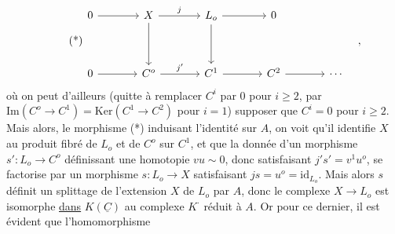 \begin{equation}\tag{*}
\begin{tikzcd}[column sep=large, row sep=huge]
0 \arrow[r] & X \arrow[r, "j"] \arrow[d] & L_o \arrow[r] \arrow[d] & 0 \\
0 \arrow[r] & C^o \arrow[r, "j'"] & C^1 \arrow[r] & C^2 \arrow[r] & \cdots
\end{tikzcd}\quad ,
\end{equation}
où on peut d'ailleurs (quitte à remplacer $C^i$ par $0$ pour $i \geq 2$, par $\mathrm{Im}(C^o \longrightarrow C^1) = \mathrm{Ker}(C^1 \longrightarrow C^2)$ pour $i = 1$) supposer que $C^i = 0$ pour $i \geq 2$. Mais alors, le morphisme (*) induisant l'identité sur $A$, on voit qu'il identifie $X$ au produit fibré de $L_o$ et de $C^o$ sur $C^1$, et que la donnée d'un morphisme $s' : L_o \longrightarrow C^o$ définissant une homotopie $vu \sim 0$, donc satisfaisant $j's' = v^1u^o$, se factorise par un morphisme $s : L_o \longrightarrow X$ satisfaisant $js = u^o = \mathrm{id}_{L_o}$. Mais alors $s$ définit un splittage de l'extension $X$ de $L_o$ par $A$, donc le complexe $X \longrightarrow L_o$ est isomorphe \underline{dans} $K(\underline{C})$ au complexe $K^{\cdot}$
réduit à $A$. Or pour ce dernier, il est évident que l'homomorphisme

